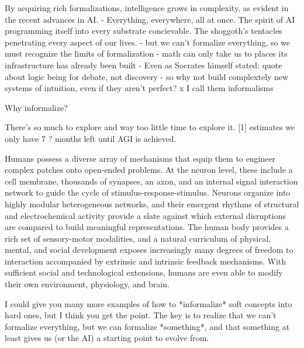 By acquiring rich formalizations, intelligence grows in complexity, as evident in the recent advances in AI.
    - Everything, everywhere, all at once. The spirit of AI programming itself into every substrate concievable. The shoggoth's tentacles penetrating every aspect of our lives.
    - but we can't formalize everything, so we must recognize the limits of formalization
        - math can only take us to places its infrastructure has already been built
            - Even as Socrates himself stated: quote about logic being for debate, not discovery
        - so why not build complextely new systems of intuition, even if they aren't perfect?
            x  I call them informalisms

Why informalize?

There's so much to explore and way too little time to explore it. [1] estimates we only have 7 ? months left until AGI is achieved.

Humans possess a diverse array of mechanisms that equip them to engineer complex patches onto open-ended problems. At the neuron level, these include a cell membrane, thousands of synapses, an axon, and an internal signal interaction network to guide the cycle of stimulus-response-stimulus. Neurons organize into highly modular heterogeneous networks, and their emergent rhythms of structural and electrochemical activity provide a slate against which external disruptions are compared to build meaningful representations. The human body provides a rich set of sensory-motor modalities, and a natural curriculum of physical, mental, and social development exposes increasingly many degrees of freedom to interaction accompanied by extrinsic and intrinsic feedback mechanisms. With sufficient social and technological extensions, humans are even able to modify their own environment, physiology, and brain.









I could give you many more examples of how to *informalize* soft concepts into hard ones, but I think you get the point. The key is to realize that we can't formalize everything, but we can formalize *something*, and that something at least gives us (or the AI) a starting point to evolve from.
